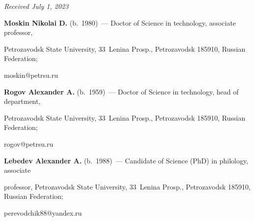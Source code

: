 \vspace*{-8pt}





\hfill{\small\textit{Received July 1, 2023}} 





\vspace*{-16pt} 


  


\Contr





\vspace*{-3pt}





\noindent


\textbf{Moskin Nikolai D.} (b.\ 1980)~--- Doctor of Science in technology, associate professor, 


Petrozavodsk State University, 33~Lenina Prosp., Petrozavodsk 185910, Russian Federation; 


\mbox{moskin@petrsu.ru}





\vspace*{3pt}





\noindent


\textbf{Rogov Alexander A.} (b.\ 1959)~--- Doctor of Science in technology, head of department, 


Petrozavodsk State University, 33~Lenina Prosp., Petrozavodsk 185910, Russian Federation; 


\mbox{rogov@petrsu.ru}





\vspace*{3pt}





\noindent


\textbf{Lebedev Alexander A.} (b.\ 1988)~--- Candidate of Science (PhD) in philology, associate 


professor, Petrozavodsk State University, 33~Lenina Prosp., Petrozavodsk 185910, Russian Federation; 


\mbox{perevodchik88@yandex.ru}








\label{end\stat}





\renewcommand{\bibname}{\protect\rm Литература}


